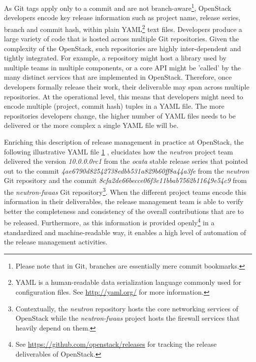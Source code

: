 \documentclass[dvipsnames]{bmcart}
\theoremstyle{definition}
\begin{document}
As Git tags apply only to a commit and are not branch-aware\footnote{Please note that in Git, branches are essentially mere commit bookmarks.}, OpenStack developers encode key release information such as project name, release series, branch and commit hash, within plain YAML\footnote{YAML is a human-readable data serialization language commonly used for configuration files. See \url{http://yaml.org/} for more information.} text files. Developers produce a large variety of code that is hosted across multiple Git repositories. Given the complexity of the OpenStack, such repositories are highly inter-dependent and tightly integrated. For example, a repository might host a library used by multiple teams in multiple components, or a core API might be 'called' by the many distinct services that are implemented in OpenStack. Therefore, once developers formally release their work, their deliverable may span across multiple repositories. At the operational level, this means that developers might need to encode multiple (project, commit hash) tuples in a YAML file. The more repositories developers change, the higher number of YAML files needs to be delivered or the more complex a single YAML file will be. 

Enriching this description of release management in practice at OpenStack, the following illustrative YAML file \hyperlink{hl1}{1} , elucidates how the \textit{neutron} project team delivered the version  \textit{10.0.0.0rc1} from the \textit{ocata} stable release series that pointed  out to the commit \textit{4ae6790d82542738edbb531a829b60ff8a44a3fe} from the \textit{neutron} Git repository and the commit \textit{8cfa2de66becce06f3e11bbab7562b11649e54c9} from the \textit{neutron-fwaas} Git repository\footnote{Contextually, the \textit{neutron} repository hosts the core networking services of OpenStack while the \textit{neutron-fwaas} project hosts the firewall services that heavily depend on them.}.  When the different project teams encode this information in their deliverables, the release management team is able to verify better the completeness and consistency of the overall contributions that are to be released. Furthermore, as this information is provided openly\footnote{See \url{https://github.com/openstack/releases}  for tracking the release deliverables of OpenStack.} in a standardized and machine-readable way, it enables a high level of automation of the release management activities. 
\end{document}
